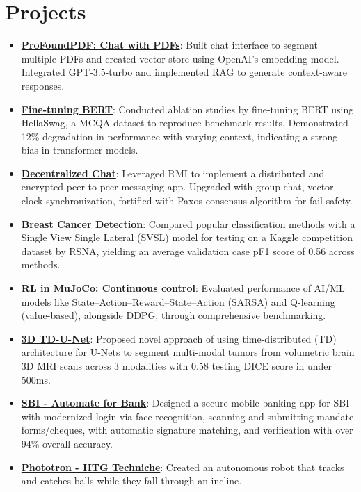 \documentclass[letterpaper,10pt]{article}
\newcommand{\resumeItem}[2]{
    \item\small{
        \textbf{#1}{: #2 \vspace{-2pt}}
    }
}
\newcommand{\resumeSubItem}[2]{\resumeItem{#1}{#2}\vspace{-4pt}}
\newcommand{\resumeSubHeadingListStart}{\begin{itemize}[leftmargin=*]}
\newcommand{\resumeSubHeadingListEnd}{\end{itemize}}
\begin{document}
\section{Projects}
	\resumeSubHeadingListStart
		\resumeSubItem{\href{https://github.com/killerpanda101/ProfoundPDF}{ProFoundPDF: Chat with PDFs}}
			{Built chat interface to segment multiple PDFs and created vector store using OpenAI’s embedding model. Integrated GPT-3.5-turbo and implemented RAG to generate context-aware responses.}
		\resumeSubItem{\href{https://expo.baulab.info/2023-Fall/chandrakommineni/}{Fine-tuning BERT}}
			{Conducted ablation studies by fine-tuning BERT using HellaSwag, a MCQA dataset to reproduce benchmark results. Demonstrated 12\% degradation in performance with varying context, indicating a strong bias in transformer models.}
		\resumeSubItem{\href{https://github.com/chakrabortyde/decentralized-chat}{Decentralized Chat}}
			{Leveraged RMI to implement a distributed and encrypted peer-to-peer messaging app. Upgraded with group chat, vector-clock synchronization, fortified with Paxos consensus algorithm for fail-safety.}
		\resumeSubItem{\href{https://arxiv.org/abs/2307.11274}{Breast Cancer Detection}}
			{Compared popular classification methods with a Single View Single Lateral (SVSL) model for testing on a Kaggle competition dataset by RSNA, yielding an average validation case pF1 score of 0.56 across methods.}
		\resumeSubItem{\href{https://arxiv.org/abs/2307.11166}{RL in MuJoCo: Continuous control}}
			{Evaluated performance of AI/ML models like State–Action–Reward–State–Action (SARSA) and Q-learning (value-based), alongside DDPG, through comprehensive benchmarking.}
		\resumeSubItem{\href{https://link.springer.com/chapter/10.1007/978-981-13-9042-5_62}{3D TD-U-Net}}
			{Proposed novel approach of using time-distributed (TD) architecture for U-Nets to segment multi-modal tumors from volumetric brain 3D MRI scans across 3 modalities with 0.58 testing DICE score in under 500ms.}
		\resumeSubItem{\href{https://docs.google.com/presentation/d/1wWlrl-6nVuNv_YIbc-k_QthzPksekqE9/edit?usp=sharing&ouid=114017657647498334204&rtpof=true&sd=true}{SBI - Automate for Bank}}
			{Designed a secure mobile banking app for SBI with modernized login via face recognition, scanning and submitting mandate forms/cheques, with automatic signature matching, and verification with over 94\% overall accuracy.}
		\resumeSubItem{\href{https://drive.google.com/file/d/0B-SyYE_cCFMbTU5PSGg4RkZKN3M/view?usp=sharing&resourcekey=0-K6pHY4o2TEB7GFdVE2kRGg}{Phototron - IITG Techniche}}
			{Created an autonomous robot that tracks and catches balls while they fall through an incline.}
	\resumeSubHeadingListEnd
\end{document}
